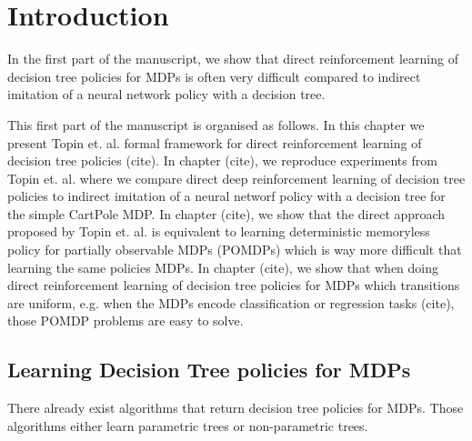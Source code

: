 \chapter{Introduction}
In the first part of the manuscript, we show that direct reinforcement learning of decision tree policies for MDPs is often very difficult compared to indirect imitation of a neural network policy with a decision tree.

This first part of the manuscript is organised as follows.
In this chapter we present Topin et. al. formal framework for direct reinforcement learning of decision tree policies (cite).
In chapter (cite), we reproduce experiments from Topin et. al. where we compare direct deep reinforcement learning of decision tree policies to indirect imitation of a neural networf policy with a decision tree for the simple CartPole MDP.
In chapter (cite), we show that the direct approach proposed by Topin et. al. is equivalent to learning deterministic memoryless policy for partially observable MDPs (POMDPs) which is way more difficult that learning the same policies MDPs.
In chapter (cite), we show that when doing direct reinforcement learning of decision tree policies for MDPs which transitions are uniform, e.g. when the MDPs encode classification or regression tasks (cite), those POMDP problems are easy to solve. 

\section{Learning Decision Tree policies for MDPs}
There already exist algorithms that return decision tree policies for MDPs.
Those algorithms either learn parametric trees or non-parametric trees.

